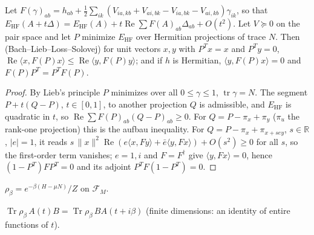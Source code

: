 \begin{theorem}\label{thm:hf-aufbau}
  \leanok
  Let $F(\gamma)_{ab}=h_{ab}+\tfrac12\sum_{ik}(V_{ia,kb}+V_{ai,bk}-V_{ia,bk}-V_{ai,kb})\gamma_{ik}$, so that
  $E_{\mathrm{HF}}(A+t\Delta)=E_{\mathrm{HF}}(A)+t\operatorname{Re}\sum F(A)_{ab}\Delta_{ab}+O(t^2)$. Let $V\succeq0$ on the pair
  space and let $P$ minimize $E_{\mathrm{HF}}$ over Hermitian projections of trace $N$. Then (Bach--Lieb--Loss--Solovej)
  for unit vectors $x,y$ with $P^Tx=x$ and $P^Ty=0$, $\operatorname{Re}\langle x,F(P)x\rangle\le\operatorname{Re}\langle y,F(P)y\rangle$;
  and if $h$ is Hermitian, $\langle y,F(P)x\rangle=0$ and $F(P)P^T=P^TF(P)$.
\end{theorem}
\begin{proof}\leanok
  By Lieb's principle $P$ minimizes over all $0\le\gamma\le1$, $\operatorname{tr}\gamma=N$. The segment $P+t(Q-P)$,
  $t\in[0,1]$, to another projection $Q$ is admissible, and $E_{\mathrm{HF}}$ is quadratic in $t$, so
  $\operatorname{Re}\sum F(P)_{ab}(Q-P)_{ab}\ge0$. For $Q=P-\pi_x+\pi_y$ ($\pi_u$ the rank-one projection) this is the aufbau
  inequality. For $Q=P-\pi_x+\pi_{x+sey}$, $s\in\mathbb R$, $|e|=1$, it reads
  $s\,\|x\|^2\operatorname{Re}(e\langle x,Fy\rangle+\bar e\langle y,Fx\rangle)+O(s^2)\ge0$ for all $s$, so the first-order term
  vanishes; $e=1,i$ and $F=F^\dagger$ give $\langle y,Fx\rangle=0$, hence $(1-P^T)FP^T=0$ and its adjoint $P^TF(1-P^T)=0$.
\end{proof}

\begin{definition}\label{def:gibbs}
  $\rho_\beta = e^{-\beta(H-\mu N)}/Z$ on $\mathcal F_M$.
\end{definition}

\begin{theorem}\label{thm:kms}
  $\operatorname{Tr}\rho_\beta\, A(t) B = \operatorname{Tr}\rho_\beta\, B A(t+i\beta)$ (finite dimensions: an identity of
  entire functions of $t$).
\end{theorem}
